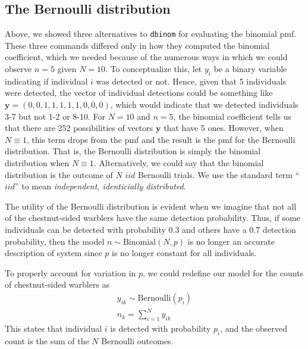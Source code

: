 \subsection{The Bernoulli distribution}


Above, we showed three alternatives to \verb+dbinom+ for evaluating the
binomial pmf. These three commands differed only in how they computed
the binomial coefficient, which we needed because of the numerous ways
in which we could observe $n=5$ given $N=10$. To conceptualize
this, let $y_i$ be a binary variable indicating if individual $i$
was detected or not. Hence, given that 5 individuals were detected,
the vector of individual detections could be something like
$\mathbf{y}=(0,0,1,1,1,1,1,0,0,0)$, which would indicate
that we detected individuals 3-7 but not 1-2 or 8-10. For $N=10$ and
$n=5$, the binomial coefficient tells us that there
are 252 possibilities of vectors $\mathbf{y}$ that have 5 ones. However, when $N \equiv 1$, this term
drops from the pmf and the result is the pmf for the Bernoulli
distribution. That is, the Bernoulli distribution is simply the
binomial distribution when $N \equiv 1$. Alternatively, we could say that the binomial
distribution is the outcome of $N$ $iid$ Bernoulli trials. We use the
standard term ``$iid$'' to mean {\it independent, identicially distributed}.

The utility of the Bernoulli distribution is evident when we imagine
that not all of the chestnut-sided warblers have the same detection
probability. Thus, if some individuals can be detected with
probability 0.3 and others have a 0.7 detection probability, then the
model $n \sim \text{Binomial}(N, p)$ is no longer an accurate
description of system since $p$ is no
longer constant for all individuals. %


To properly account for variation in $p$, we could redefine our model
for the %
counts of chestnut-sided warblers as
\begin{gather}
y_{ik} \sim \text{Bernoulli}(p_i) \nonumber \\%
n_k = \sum_{i=1}^N y_{ik}
\label{modeling.eq.Bern}
\end{gather}
This  states that individual $i$ is detected with probability
$p_i$, and the observed count is the sum of the $N$ Bernoulli
outcomes.

